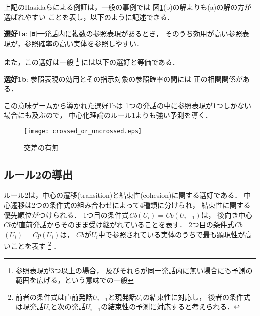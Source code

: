 上記のHasidaらによる例証は，一般の事例では
図\ref{fig:crossed_or_uncrossed}(b)の解よりも(a)の解の方が選ばれやすい
ことを表し，以下のように記述できる．
\vspace{2mm}
\begin{breakbox}
\noindent
{\bf 選好1a}: 同一発話内に複数の参照表現があるとき，
そのうち効用が高い参照表現が，参照確率の高い実体を参照しやすい．
\end{breakbox}
\noindent
また，この選好は一般
\footnote{参照表現が3つ以上の場合，
及びそれらが同一発話内に無い場合にも予測の範囲を広げる，という意味での一般}
には以下の選好と等価である．
\vspace{2mm}
\begin{breakbox}
\noindent
{\bf 選好1b}: 参照表現の効用とその指示対象の参照確率の間には
正の相関関係がある．
\end{breakbox}
\noindent
この意味ゲームから導かれた選好1bは
1つの発話の中に参照表現が1つしかない場合にも及ぶので，
中心化理論のルール1よりも強い予測を導く．















\begin{figure}[tb]
 \begin{center}
  \texttt{[image: crossed\_or\_uncrossed.eps]}
  \caption{交差の有無}
  \label{fig:crossed_or_uncrossed}
 \end{center}
\end{figure}

























\subsection{ルール2の導出}
\label{subsec:rule2}
ルール2は，中心の遷移(transition)と結束性(cohesion)に関する選好である．
中心遷移は2つの条件式の組み合わせによって4種類に分けられ，
結束性に関する優先順位がつけられる．
1つ目の条件式{\it Cb}$(U_i) = ${\it Cb}$(U_{i-1})$は，
後向き中心$Cb$が直前発話からそのまま受け継がれていることを表す．
2つ目の条件式{\it Cb}$(U_i) = ${\it Cp}$(U_i)$は，
$Cb$が$U_i$中で参照されている実体のうちで最も顕現性が高いことを表す
\footnote{前者の条件式は直前発話$U_{i-1}$と現発話$U_i$の結束性に対応し，
後者の条件式は現発話$U_i$と次の発話$U_{i+1}$の結束性の予測に対応すると考えられる．}
．

